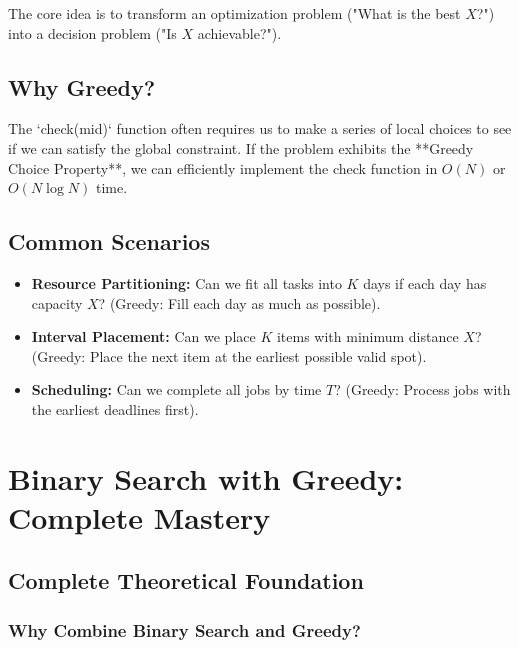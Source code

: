 \documentclass[11pt,a4paper,oneside]{book}
\begin{document}
The core idea is to transform an optimization problem ("What is the best $X$?") into a decision problem ("Is $X$ achievable?"). 

\subsection{Why Greedy?}
The `check(mid)` function often requires us to make a series of local choices to see if we can satisfy the global constraint. If the problem exhibits the **Greedy Choice Property**, we can efficiently implement the check function in $O(N)$ or $O(N \log N)$ time.

\subsection{Common Scenarios}
\begin{itemize}
    \item \textbf{Resource Partitioning:} Can we fit all tasks into $K$ days if each day has capacity $X$? (Greedy: Fill each day as much as possible).
    \item \textbf{Interval Placement:} Can we place $K$ items with minimum distance $X$? (Greedy: Place the next item at the earliest possible valid spot).
    \item \textbf{Scheduling:} Can we complete all jobs by time $T$? (Greedy: Process jobs with the earliest deadlines first).
\end{itemize}

\section{Binary Search with Greedy: Complete Mastery}

\subsection{Complete Theoretical Foundation}

\subsubsection{Why Combine Binary Search and Greedy?}
\end{document}
